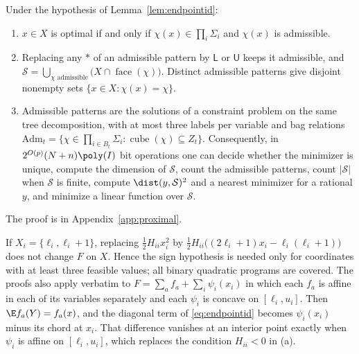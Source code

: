 \begin{corollary}\label{cor:facecsp}
Under the hypothesis of Lemma~\ref{lem:endpointid}:
\begin{enumerate}
\item[(i)] $x\in X$ is optimal if and only if $\chi(x)\in\prod_i\Sigma_i$
and $\chi(x)$ is admissible.
\item[(ii)] Replacing any $\ast$ of an admissible pattern by $\mathsf L$ or
$\mathsf U$ keeps it admissible, and
$\mathcal S=\bigcup_{\chi\text{ admissible}}\bigl(X\cap\operatorname{face}(\chi)\bigr)$.
Distinct admissible patterns give disjoint nonempty sets
$\{x\in X:\chi(x)=\chi\}$.
\item[(iii)] Admissible patterns are the solutions of a constraint problem on
the same tree decomposition, with at most three labels per variable and bag
relations
$\mathrm{Adm}_t=\{\chi\in\prod_{i\in B_t}\Sigma_i:\operatorname{cube}(\chi)
\subseteq Z_t\}$. Consequently, in $2^{O(p)}(N+n)\poly(I)$ bit operations
one can decide whether the minimizer is unique, compute the dimension of
$\mathcal S$, count the admissible patterns, count $|\mathcal S|$ when
$\mathcal S$ is finite, compute $\dist(y,\mathcal S)^2$ and a nearest
minimizer for a rational $y$, and minimize a linear function over
$\mathcal S$.
\end{enumerate}
\end{corollary}

The proof is in Appendix~\ref{app:proximal}.

\begin{remark}\label{rem:endpointext}
If $X_i=\{\ell_i,\ell_i+1\}$, replacing $\frac12H_{ii}x_i^2$ by
$\frac12H_{ii}\bigl((2\ell_i+1)x_i-\ell_i(\ell_i+1)\bigr)$ does not change $F$
on $X$. Hence the sign hypothesis is needed only for coordinates with at least
three feasible values; all binary quadratic programs are covered. The proofs
also apply verbatim to $F=\sum_af_a+\sum_i\psi_i(x_i)$ in which each $f_a$ is
affine in each of its variables separately and each $\psi_i$ is concave on
$[\ell_i,u_i]$. Then $\E f_a(Y)=f_a(x)$, and the diagonal term of
\eqref{eq:endpointid} becomes $\psi_i(x_i)$ minus its chord at $x_i$. That
difference vanishes at an interior point exactly when $\psi_i$ is affine on
$[\ell_i,u_i]$, which replaces the condition $H_{ii}<0$ in (a).
\end{remark}

